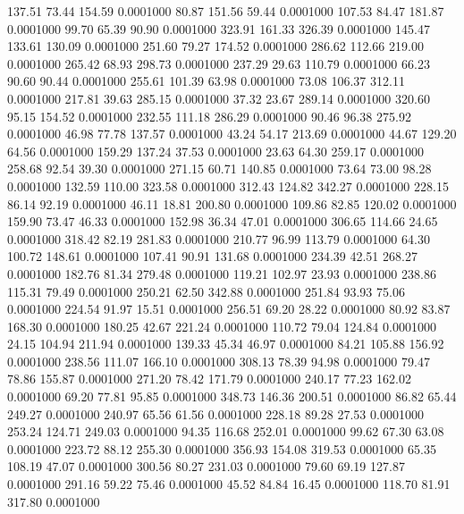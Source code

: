  137.51   73.44  154.59   0.0001000
  80.87  151.56   59.44   0.0001000
 107.53   84.47  181.87   0.0001000
  99.70   65.39   90.90   0.0001000
 323.91  161.33  326.39   0.0001000
 145.47  133.61  130.09   0.0001000
 251.60   79.27  174.52   0.0001000
 286.62  112.66  219.00   0.0001000
 265.42   68.93  298.73   0.0001000
 237.29   29.63  110.79   0.0001000
  66.23   90.60   90.44   0.0001000
 255.61  101.39   63.98   0.0001000
  73.08  106.37  312.11   0.0001000
 217.81   39.63  285.15   0.0001000
  37.32   23.67  289.14   0.0001000
 320.60   95.15  154.52   0.0001000
 232.55  111.18  286.29   0.0001000
  90.46   96.38  275.92   0.0001000
  46.98   77.78  137.57   0.0001000
  43.24   54.17  213.69   0.0001000
  44.67  129.20   64.56   0.0001000
 159.29  137.24   37.53   0.0001000
  23.63   64.30  259.17   0.0001000
 258.68   92.54   39.30   0.0001000
 271.15   60.71  140.85   0.0001000
  73.64   73.00   98.28   0.0001000
 132.59  110.00  323.58   0.0001000
 312.43  124.82  342.27   0.0001000
 228.15   86.14   92.19   0.0001000
  46.11   18.81  200.80   0.0001000
 109.86   82.85  120.02   0.0001000
 159.90   73.47   46.33   0.0001000
 152.98   36.34   47.01   0.0001000
 306.65  114.66   24.65   0.0001000
 318.42   82.19  281.83   0.0001000
 210.77   96.99  113.79   0.0001000
  64.30  100.72  148.61   0.0001000
 107.41   90.91  131.68   0.0001000
 234.39   42.51  268.27   0.0001000
 182.76   81.34  279.48   0.0001000
 119.21  102.97   23.93   0.0001000
 238.86  115.31   79.49   0.0001000
 250.21   62.50  342.88   0.0001000
 251.84   93.93   75.06   0.0001000
 224.54   91.97   15.51   0.0001000
 256.51   69.20   28.22   0.0001000
  80.92   83.87  168.30   0.0001000
 180.25   42.67  221.24   0.0001000
 110.72   79.04  124.84   0.0001000
  24.15  104.94  211.94   0.0001000
 139.33   45.34   46.97   0.0001000
  84.21  105.88  156.92   0.0001000
 238.56  111.07  166.10   0.0001000
 308.13   78.39   94.98   0.0001000
  79.47   78.86  155.87   0.0001000
 271.20   78.42  171.79   0.0001000
 240.17   77.23  162.02   0.0001000
  69.20   77.81   95.85   0.0001000
 348.73  146.36  200.51   0.0001000
  86.82   65.44  249.27   0.0001000
 240.97   65.56   61.56   0.0001000
 228.18   89.28   27.53   0.0001000
 253.24  124.71  249.03   0.0001000
  94.35  116.68  252.01   0.0001000
  99.62   67.30   63.08   0.0001000
 223.72   88.12  255.30   0.0001000
 356.93  154.08  319.53   0.0001000
  65.35  108.19   47.07   0.0001000
 300.56   80.27  231.03   0.0001000
  79.60   69.19  127.87   0.0001000
 291.16   59.22   75.46   0.0001000
  45.52   84.84   16.45   0.0001000
 118.70   81.91  317.80   0.0001000
